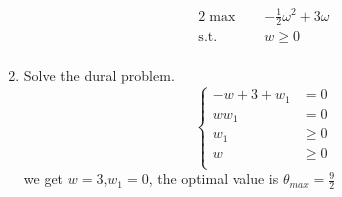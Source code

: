 \documentclass[paper=a4, fontsize=11pt]{scrartcl} %
\numberwithin{equation}{section} %
\numberwithin{figure}{section} %
\numberwithin{table}{section} %
\begin{document}
\begin{enumerate}
\begin{alignat}{2}          \nonumber
\max\quad & -\frac{1}{2}\omega^2+3\omega\\    \nonumber
\mbox{s.t.}\quad            \nonumber
&w \geq 0\\         \nonumber
\end{alignat}
\item   Solve the dural problem.
\begin{equation} \nonumber
\left\{
\begin{aligned}
-w+3+w_1 &= 0\\
ww_1 &= 0\\
w_1&\geq 0\\
w&\geq 0\\
\end{aligned}
\right.
\end{equation}
we get $w=3$,$w_1=0$, the optimal value is $\theta_{max}=\frac{9}{2}$
\end{enumerate}
\end{document}
